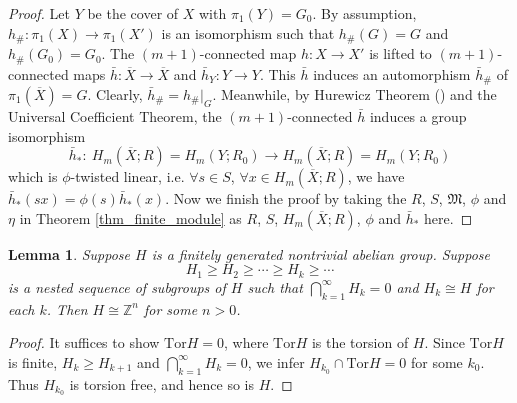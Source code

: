 \documentclass[12pt]{amsart}
\theoremstyle{plain}
\newtheorem{lemma}[theorem]{Lemma}
\theoremstyle{definition}
\theoremstyle{question}
\theoremstyle{remark}
\theoremstyle{assumption}
\numberwithin{equation}{section}
\theoremstyle{bigthm}
\begin{document}
\begin{proof}
Let $Y$ be the cover of $X$ with $\pi_{1} (Y) = G_{0}$. By assumption, $h_{\#} \colon  \pi_{1} (X) \rightarrow \pi_{1} (X')$ is an isomorphism such that $h_{\#} (G) = G$ and $h_{\#} (G_{0}) = G_{0}$. The $(m+1)$-connected map $h \colon  X \rightarrow X'$ is lifted to $(m+1)$-connected maps $\bar{h} \colon  \overline{X} \rightarrow \overline{X}$ and $\bar{h}_{Y} \colon  Y \rightarrow Y$. This $\bar{h}$ induces an automorphism $\bar{h}_{\#}$ of $\pi_{1} (\overline{X}) = G$. Clearly, $\bar{h}_{\#} = {h_{\#}}|_{G}$. Meanwhile, by Hurewicz Theorem (\cite[Theorem~(7.1)]{G.Whitehead}) and the Universal Coefficient Theorem, the $(m+1)$-connected $\bar{h}$ induces a group isomorphism
\[
\bar{h}_{*} \colon \ H_{m} (\overline{X}; R) = H_{m} (Y; R_{0}) \rightarrow H_{m} (\overline{X}; R) = H_{m} (Y; R_{0})
\]
which is $\phi$-twisted linear, i.e. $\forall s \in S$, $\forall x \in H_{m} (\overline{X}; R)$, we have $\bar{h}_{*} (sx) = \phi (s) \bar{h}_{*} (x)$. Now we finish the proof by taking the $R$, $S$, $\mathfrak{M}$, $\phi$ and $\eta$ in Theorem \ref{thm_finite_module} as $R$, $S$, $H_{m} (\overline{X}; R)$, $\phi$ and $\bar{h}_{*}$ here.
\end{proof}

\begin{lemma}\label{lem_free_abelian}
Suppose $H$ is a finitely generated nontrivial abelian group. Suppose
\[
H_{1} \ge H_{2} \ge \cdots \ge H_{k} \ge \cdots
\]
is a nested sequence of subgroups of $H$ such that $\bigcap_{k=1}^{\infty} H_{k} = 0$ and $H_{k} \cong H$ for each $k$. Then $H \cong \mathbb{Z}^{n}$ for some $n>0$.
\end{lemma}
\begin{proof}
It suffices to show $\mathrm{Tor} H =0$, where $\mathrm{Tor} H$ is the torsion of $H$. Since $\mathrm{Tor} H$ is finite, $H_{k} \ge H_{k+1}$ and $\bigcap_{k=1}^{\infty} H_{k} = 0$, we infer $H_{k_{0}} \cap \mathrm{Tor} H = 0$ for some $k_{0}$. Thus $H_{k_{0}}$ is torsion free, and hence so is $H$.
\end{proof}
\end{document}
